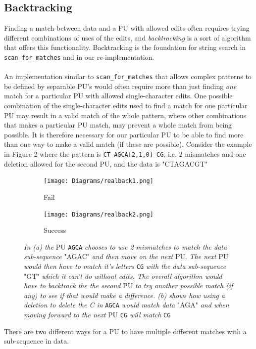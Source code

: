 \documentclass[12pt]{article}
\newcommand{\scm}{\texttt{scan\_for\_matches} }
\newcommand{\pu}{PU }
\newcommand{\pus}{PU's }
\newcommand{\pup}{PU. }
\begin{document}
\subsection{Backtracking}
Finding a match between data and a \pu with allowed edits often requires trying 
different combinations of uses of the edits, and \emph{backtracking} is a sort of algorithm that offers this functionality.
Backtracking is the foundation for string search in \scm and in our re-implementation. \\ \\
An implementation similar to
\scm that allows complex patterns to be defined by separable \pus would often require more than just finding \textit{one}
match for a particular \pu with allowed single-character edits. One possible combination of the single-character
edits used to find a match for one particular \pu may result in a valid match of the whole pattern, 
where other combinations that makes a particular \pu match, may prevent a whole match from being possible.
It is therefore necessary for our particular \pu to be able to find more than one way to make a valid match (if these are
possible). Consider the example in Figure 2 where the pattern is
\texttt{CT\; AGCA[2,1,0]\; CG}, i.e. 2 mismatches and
one deletion allowed for the second PU, and the data is
"CTAGACGT"
\begin{figure}[H]
\centering
\begin{subfigure}[b]{0.4 \textwidth}
\texttt{[image: Diagrams/realback1.png]}
\caption{Fail}
\end{subfigure}
\hspace{12mm}
\begin{subfigure}[b]{0.448 \textwidth}
\texttt{[image: Diagrams/realback2.png]}
\caption{Success}
\end{subfigure}
\caption{\textit{In (a) the} \pu \texttt{AGCA} \textit{chooses to use 2 mismatches to match the 
data sub-sequence} "AGAC" \textit{and then move on the next} \pup \textit{The next} \pu
\textit{would then have to match it's letters} \texttt{CG} \textit{with the data sub-sequence} "GT"
\textit{which it can't do without edits. The overall algorithm would have to backtrack the the second
} \pu \textit{to try another possible match (if any) to see if that would make a difference. (b)
shows how using a deletion to delete the C in} \texttt{AGCA} \textit{would match data} "AGA" \textit{and
when moving forward to the next} \pu \texttt{CG} \textit{will match} \texttt{CG}}
\end{figure}
\noindent There are two different ways for a \pu to have multiple different matches with a sub-sequence in data. 
\end{document}
